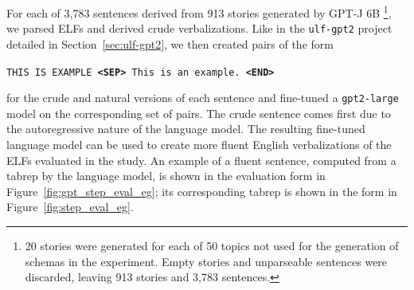 For each of 3,783 sentences derived from 913 stories generated by GPT-J 6B \footnote{20 stories were generated for each of 50 topics not used for the generation of schemas in the experiment. Empty stories and unparseable sentences were discarded, leaving 913 stories and 3,783 sentences.}, we parsed ELFs and derived crude verbalizations. Like in the \texttt{ulf-gpt2} project detailed in Section~\ref{sec:ulf-gpt2}, we then created pairs of the form \begin{center}
\texttt{THIS IS EXAMPLE \textbf{<SEP>} This is an example. \textbf{<END>}}
\end{center}
for the crude and natural versions of each sentence and fine-tuned a \texttt{gpt2-large} model on the corresponding set of pairs. The crude sentence comes first due to the autoregressive nature of the language model. The resulting fine-tuned language model can be used to create more fluent English verbalizations of the ELFs evaluated in the study. An example of a fluent sentence, computed from a tabrep by the language model, is shown in the evaluation form in Figure~\ref{fig:gpt_step_eval_eg}; its corresponding tabrep is shown in the form in Figure~\ref{fig:step_eval_eg}.